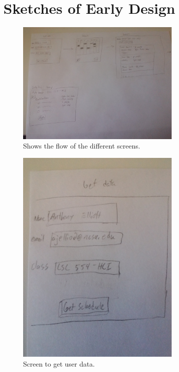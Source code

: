 \documentclass[conference]{IEEEtran}
\begin{document}
\appendices
\section{Sketches of Early Design}
\begin{figure}[ht!]
\centering
\includegraphics[width=80mm]{figures/flow}
\caption{Shows the flow of the different screens. \label{fig:flow}}
\end{figure}

\begin{figure}[ht!]
\centering
\includegraphics[width=80mm]{figures/getUserData}
\caption{Screen to get user data. \label{fig:userData}}
\end{figure}
\end{document}
